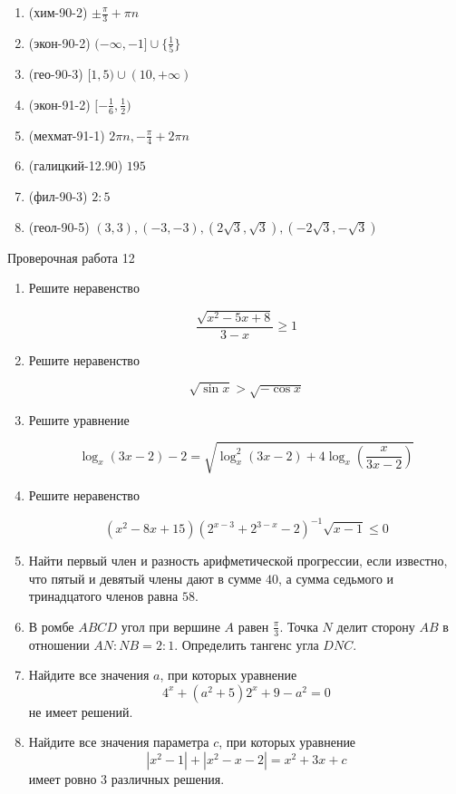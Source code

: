 \documentclass[11pt,a5paper]{report}
\begin{document}
\begin{enumerate}

\item (хим-90-2) $\pm \frac{\pi}{3}+\pi n$

\item (экон-90-2) $(-\infty, -1]\cup\{\frac{1}{5}\}$

\item (гео-90-3) $[1, 5)\cup(10, +\infty)$

\item (экон-91-2) $[-\frac{1}{6}, \frac{1}{2})$

\item (мехмат-91-1) $2\pi n, -\frac{\pi}{4}+2\pi n$

\item (галицкий-12.90) $195$

\item (фил-90-3) $2:5$

\item (геол-90-5) $(3, 3), (-3, -3), (2\sqrt{3}, \sqrt{3}), (-2\sqrt{3}, -\sqrt{3})$

\end{enumerate}

\newpage

\begin{center}
Проверочная работа 12


\end{center}

\begin{enumerate}

\item Решите неравенство

$$\frac{\sqrt{x^2-5x+8}}{3-x} \geqslant 1$$

\item Решите неравенство

$$\sqrt{\sin x} > \sqrt{-\cos x}$$

\item Решите уравнение

$$\log_{x}(3x-2)-2=\sqrt{\log_{x}^2(3x-2)+4\log_{x}\left(\frac{x}{3x-2}\right)}$$

\item Решите неравенство

$$(x^2-8x+15)(2^{x-3}+2^{3-x}-2)^{-1}\sqrt{x-1} \leqslant 0$$

\item Найти первый член и разность арифметической прогрессии, если известно, что пятый и девятый члены дают в сумме $40$, а сумма седьмого и тринадцатого членов равна $58$.

\item В ромбе $ABCD$ угол при вершине $A$ равен $\frac{\pi}{3}$. Точка $N$ делит сторону $AB$ в отношении $AN:NB=2:1$. Определить тангенс угла $DNC$.

\item Найдите все значения $a$, при которых уравнение $$4^x+(a^2+5)2^x+9-a^2=0$$ не имеет решений.

\item Найдите все значения параметра $c$, при которых уравнение
$$|x^2-1|+|x^2-x-2|=x^2+3x+c$$
имеет ровно 3 различных решения.
\end{enumerate}
\end{document}
